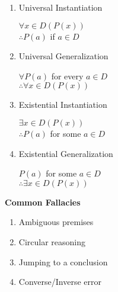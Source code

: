 \documentclass[landscape, a4paper]{article}
\newcommand{\heading}[1]{
    \noindent\textbf{#1}
}
\newenvironment{wenumerate}{\begin{enumerate}[wide, labelindent=2pt]}{\end{enumerate}}
\begin{document}
\begin{multicols*}{4}
\begin{wenumerate}
{            $\therefore \forall x (P(x)\implies R(x))$ \par
        }
        \item Universal Instantiation
        \par {\centering
            $\forall x\in D(P(x))$        \\
            $\therefore P(a)$ if $a\in D$ \par
        }
        \item Universal Generalization
        \par {\centering
            $\forall P(a)$ for every $a\in D$        \\
            $\therefore \forall x\in D (P(x))$ \par
        }
        \item Existential Instantiation
        \par {\centering
            $\exists x\in D (P(x))$        \\
            $\therefore P(a)$ for some $a\in D$ \par
        }
        \item Existential Generalization
        \par {\centering
            $P(a)$ for some $a\in D$        \\
            $\therefore \exists x\in D (P(x))$ \par
        }
    \end{wenumerate}

    \heading{Common Fallacies}
    \begin{wenumerate}
        \item Ambiguous premises
        \item Circular reasoning
        \item Jumping to a conclusion
        \item Converse/Inverse error
    \end{wenumerate}


\end{multicols*}
\end{document}
